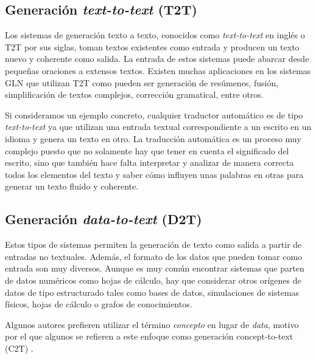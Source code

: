 \subsection{Generación \textit{text-to-text} (T2T)}
Los sistemas de generación texto a texto, conocidos como \textit{text-to-text} en inglés o T2T por sus siglas, toman textos existentes como entrada y producen un texto nuevo y coherente como salida. La entrada de estos sistemas puede abarcar desde pequeñas oraciones a extensos textos. Existen muchas aplicaciones en los sistemas GLN que utilizan T2T como pueden ser generación de resúmenes, fusión, simplificación de textos complejos, corrección gramatical, entre otros.

Si consideramos un ejemplo concreto, cualquier traductor automático es de tipo \textit{text-to-text} ya que utilizan una entrada textual correspondiente a un escrito en un idioma y genera un texto en otro. La traducción automática es un proceso muy complejo puesto que no solamente hay que tener en cuenta el significado del escrito, sino que también hace falta interpretar y analizar de manera correcta todos los elementos del texto y saber cómo influyen unas palabras en otras para generar un texto fluido y coherente.

\subsection{Generación \textit{data-to-text} (D2T)}\label{cap:nglD2T}
Estos tipos de sistemas permiten la generación de texto como salida a partir de entradas no textuales. Además, el formato de los datos que pueden tomar como entrada son muy diversos. Aunque es muy común encontrar sistemas que parten de datos numéricos como hojas de cálculo, hay que considerar otros orígenes de datos de tipo estructurado tales como bases de datos, simulaciones de sistemas físicos, hojas de cálculo o grafos de conocimientos. 

Algunos autores prefieren utilizar  el término \textit{concepto} en lugar de \textit{data}, motivo por el que algunos se refieren a este enfoque como generación concept-to-text (C2T) \citep{vicente2015generacion}.

